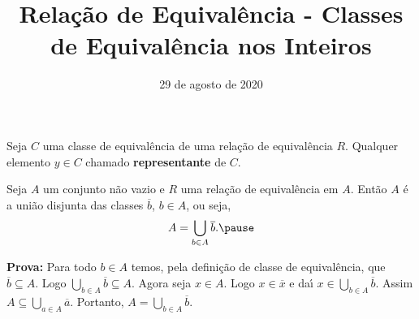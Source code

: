 \documentclass{beamer}
\title{Rela\c{c}\~ao de Equival\^encia - Classes de Equivalência nos Inteiros}
\author[\autor]{\autor}
\institute[\instituto]{\instituto}
\date{29 de agosto de 2020}
\begin{document}
    \begin{frame}
        \maketitle
    \end{frame}


    \begin{frame}
        \begin{definicao}
            Seja $C$ uma classe de equival{\^e}ncia \pause de uma rela{\c c}{\~a}o de equival{\^e}ncia $R$. \pause Qualquer elemento $y\in C$  chamado \textbf{representante} de $C$.\pause
        \end{definicao}

        \begin{proposicao}
            Seja $A$ um conjunto n{\~a}o vazio \pause e $R$ uma rela{\c c}{\~a}o de equival{\^e}ncia em $A$. \pause Ent{\~a}o $A$ {\'e} a uni{\~a}o disjunta das classes $\overline{b}$, $b \in A$, ou seja,\pause
            \[
                A = \bigcup_{b\in A}\overline{b}.\pause
            \]
        \end{proposicao}
        \noindent\textbf{Prova:}
            Para todo $b\in A$ temos, \pause pela defini\c{c}\~ao de classe de equival\^encia, que $\overline{b}\subseteq A$. \pause Logo $\bigcup_{b\in A}\overline{b}\subseteq A$. \pause Agora seja $x\in A$. \pause Logo $x \in \overline{x}$ \pause e da{\'\i} $x\in \bigcup_{b\in A}\overline{b}$. \pause Assim $A\subseteq\bigcup_{a\in A}\overline{a}$. \pause Portanto, $A=\bigcup_{b\in A}\overline{b}$.\hspace{.5cm}\qedsymbol\pause
    \end{frame}

    \begin{frame}
        
    \end{frame}
\end{document}

